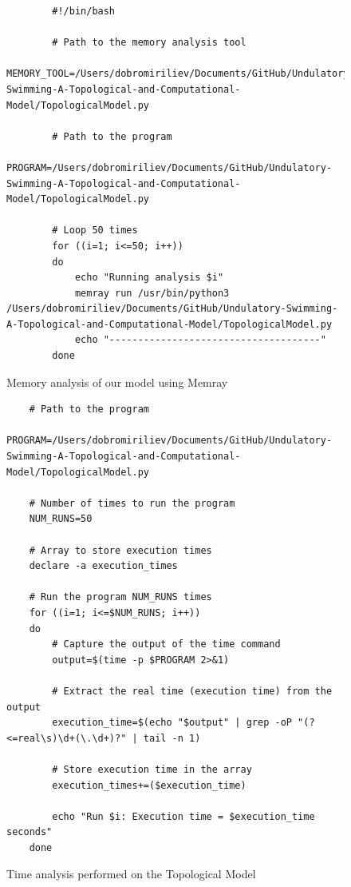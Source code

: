 \begin{figure}[!ht]
    \begin{verbatim}
        #!/bin/bash

        # Path to the memory analysis tool
        MEMORY_TOOL=/Users/dobromiriliev/Documents/GitHub/Undulatory-Swimming-A-Topological-and-Computational-Model/TopologicalModel.py
        
        # Path to the program
        PROGRAM=/Users/dobromiriliev/Documents/GitHub/Undulatory-Swimming-A-Topological-and-Computational-Model/TopologicalModel.py
        
        # Loop 50 times
        for ((i=1; i<=50; i++))
        do
            echo "Running analysis $i"
            memray run /usr/bin/python3 /Users/dobromiriliev/Documents/GitHub/Undulatory-Swimming-A-Topological-and-Computational-Model/TopologicalModel.py
            echo "-------------------------------------"
        done
    \end{verbatim}
    \caption{Memory analysis of our model using Memray}        
\end{figure}

\newpage

\begin{figure}[!ht]
    \begin{verbatim}
    # Path to the program 
    PROGRAM=/Users/dobromiriliev/Documents/GitHub/Undulatory-Swimming-A-Topological-and-Computational-Model/TopologicalModel.py

    # Number of times to run the program
    NUM_RUNS=50
        
    # Array to store execution times
    declare -a execution_times
        
    # Run the program NUM_RUNS times
    for ((i=1; i<=$NUM_RUNS; i++))
    do
        # Capture the output of the time command
        output=$(time -p $PROGRAM 2>&1)
            
        # Extract the real time (execution time) from the output
        execution_time=$(echo "$output" | grep -oP "(?<=real\s)\d+(\.\d+)?" | tail -n 1)
            
        # Store execution time in the array
        execution_times+=($execution_time)
            
        echo "Run $i: Execution time = $execution_time seconds"
    done
    \end{verbatim}
    \caption{Time analysis performed on the Topological Model}
\end{figure}

